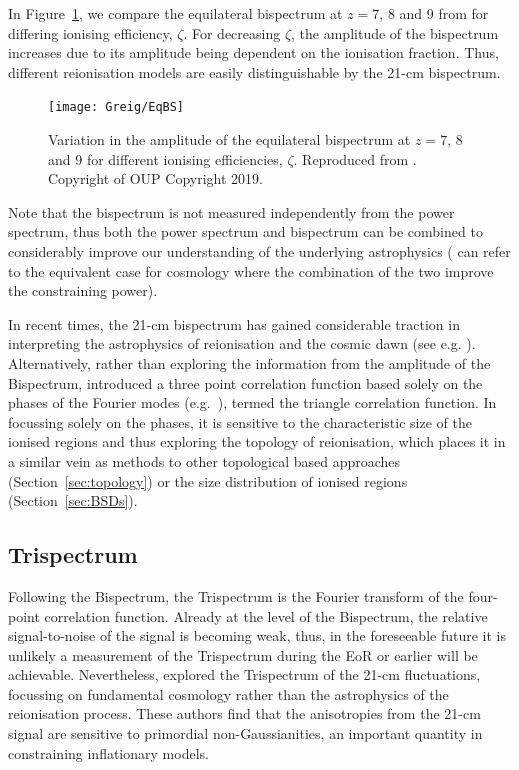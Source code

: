 In Figure~\ref{fig:EqBS}, we compare the equilateral bispectrum at $z=7$, 8 and 9 from \cite{Shimabukuro:2017} for differing ionising efficiency, $\zeta$. For decreasing $\zeta$, the amplitude of the bispectrum increases due to its amplitude being dependent on the ionisation fraction. Thus, different reionisation models are easily distinguishable by the 21-cm bispectrum.

\begin{figure}[]
\begin{center}
\texttt{[image: Greig/EqBS]}
\end{center}
\caption{Variation in the amplitude of the equilateral bispectrum at $z=7$, 8 and 9 for different ionising efficiencies, $\zeta$. Reproduced from \cite{Shimabukuro:2017}. Copyright of OUP Copyright 2019.}
\label{fig:EqBS}
\end{figure}

Note that the bispectrum is not measured independently from the power spectrum, thus both the power spectrum and bispectrum can be combined to considerably improve our understanding of the underlying astrophysics ({\color{red} can refer to the equivalent case for cosmology where the combination of the two improve the constraining power}).

In recent times, the 21-cm bispectrum has gained considerable traction in interpreting the astrophysics of reionisation and the cosmic dawn (see e.g. \cite{Bharadwaj:2005,Pillepich:2007,Yoshiura:2015,Shimabukuro:2016,Shimabukuro:2017,Watkinson:2017,Majumdar:2018,Hutter:2019,Trott:2019,Watkinson:2019}). Alternatively, rather than exploring the information from the amplitude of the Bispectrum, \cite{Gorce:2019} introduced a three point correlation function based solely on the phases of the Fourier modes (e.g.~\cite{Obreschkow:2013}), termed the triangle correlation function. In focussing solely on the phases, it is sensitive to the characteristic size of the ionised regions and thus exploring the topology of reionisation, which places it in a similar vein as methods to other topological based approaches (Section~\ref{sec:topology}) or the size distribution of ionised regions (Section~\ref{sec:BSDs}). 

\subsection{Trispectrum} \label{sec:trispectrum}

Following the Bispectrum, the Trispectrum is the Fourier transform of the four-point correlation function. Already at the level of the Bispectrum, the relative signal-to-noise of the signal is becoming weak, thus, in the foreseeable future it is unlikely a measurement of the Trispectrum during the EoR or earlier will be achievable. Nevertheless, \cite{Cooray:2008} explored the Trispectrum of the 21-cm fluctuations, focussing on fundamental cosmology rather than the astrophysics of the reionisation process. These authors find that the anisotropies from the 21-cm signal are sensitive to primordial non-Gaussianities, an important quantity in constraining inflationary models.

